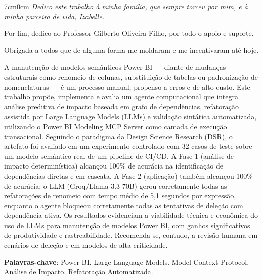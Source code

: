 \documentclass[
    12pt,               %
    openright,          %
    oneside,            %
    a4paper,            %
    chapter=TITLE,      %
    section=TITLE,      %
    brazil              %
]{abntex2}
\begin{document}
\imprimircapa

\imprimirfolhaderosto

\begin{dedicatoria}
\vspace*{\fill}
\begin{adjustwidth}{7cm}{0cm}
\raggedleft\itshape
Dedico este trabalho à minha família, que sempre torceu por mim, e à minha parceira de vida, Izabelle.\par
Por fim, dedico ao Professor Gilberto Oliveira Filho, por todo o apoio e suporte.\par
Obrigada a todos que de alguma forma me moldaram e me incentivaram até hoje.
\end{adjustwidth}
\end{dedicatoria}

\begin{resumo}
    A manutenção de modelos semânticos Power BI — diante de mudanças estruturais como renomeio de colunas, substituição de tabelas ou padronização de nomenclaturas — é um processo manual, propenso a erros e de alto custo. Este trabalho propõe, implementa e avalia um agente computacional que integra análise preditiva de impacto baseada em grafo de dependências, refatoração assistida por Large Language Models (LLMs) e validação sintática automatizada, utilizando o Power BI Modeling MCP Server como camada de execução transacional. Seguindo o paradigma da Design Science Research (DSR), o artefato foi avaliado em um experimento controlado com 32 casos de teste sobre um modelo semântico real de um pipeline de CI/CD. A Fase 1 (análise de impacto determinística) alcançou 100\% de acurácia na identificação de dependências diretas e em cascata. A Fase 2 (aplicação) também alcançou 100\% de acurácia: o LLM (Groq/Llama 3.3 70B) gerou corretamente todas as refatorações de renomeio com tempo médio de 5,1 segundos por expressão, enquanto o agente bloqueou corretamente todas as tentativas de deleção com dependência ativa. Os resultados evidenciam a viabilidade técnica e econômica do uso de LLMs para manutenção de modelos Power BI, com ganhos significativos de produtividade e rastreabilidade. Recomenda-se, contudo, a revisão humana em cenários de deleção e em modelos de alta criticidade.

    \vspace{\onelineskip}
    \noindent\textbf{Palavras-chave}: Power BI. Large Language Models. Model Context Protocol. Análise de Impacto. Refatoração Automatizada.
\end{resumo}
\end{document}
